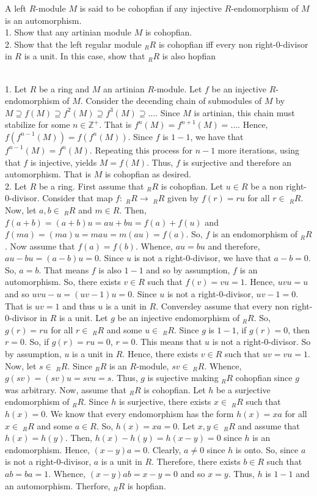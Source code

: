 A left $R$-module $M$ is said to be cohopfian if any injective $R$-endomorphism of $M$ is an
automorphism.\\
1. Show that any artinian module $M$ is cohopfian.\\
2. Show that the left regular module $_RR$ is cohopfian iff every non right-$0$-divisor in $R$ is a
unit. In this case, show that $_RR$ is also hopfian\\

\begin{solution}\renewcommand{\qedsymbol}{}\ \\
    1. Let $R$ be a ring and $M$ an artinian $R$-module. Let $f$ be an injective $R$-endomorphism of
    $M$. Consider the decending chain of submodules of $M$ by
    $M\supseteq f(M)\supseteq f^2(M)\supseteq f^3(M)\supseteq\ldots$. Since $M$ is artinian, this chain
    must stabilize for some $n\in\mathbb{Z}^+$. That is $f^n(M)=f^{n+1}(M)=\ldots$. Hence,
    $f(f^{n-1}(M))=f(f^n(M))$. Since $f$ is $1-1$, we have that $f^{n-1}(M)=f^n(M)$. Repeating this
    process for $n-1$ more iterations, using that $f$ is injective, yields $M=f(M)$. Thus, $f$ is
    surjective and therefore an automorphism. That is $M$ is cohopfian as desired.\\

    2. Let $R$ be a ring. First assume that $_RR$ is cohopfian. Let $u\in R$ be a non right-0-divisor.
    Consider that map $f:\;_RR\rightarrow\;_RR$ given by $f(r)=ru$ for all $r\in\;_RR$. Now, let
    $a,b\in\;_RR$ and $m\in R$. Then, $f(a+b)=(a+b)u=au+bu=f(a)+f(u)$ and $f(ma)=(ma)u=mau=m(au)=f(a)$.
    So, $f$ is an endomorphism of $_RR$. Now assume that $f(a)=f(b)$. Whence, $au=bu$ and therefore,
    $au-bu=(a-b)u=0$. Since $u$ is not a right-0-divisor, we have that $a-b=0$. So, $a=b$. That means
    $f$ is also $1-1$ and so by assumption, $f$ is an automorphism. So, there exists $v\in R$ such that
    $f(v)=vu=1$. Hence, $uvu=u$ and so $uvu-u=(uv-1)u=0$. Since $u$ is not a right-0-divisor, $uv-1=0$.
    That is $uv=1$ and thus $u$ is a unit in $R$. Conversley assume that every non right-0-divisor in
    $R$ is a unit. Let $g$ be an injective endomorphism of $_RR$. So, $g(r)=ru$ for all $r\in\;_RR$ and
    some $u\in\;_RR$. Since $g$ is $1-1$, if $g(r)=0$, then $r=0$. So, if $g(r)=ru=0$, $r=0$. This means
    that $u$ is not a right-0-divisor. So by assumption, $u$ is a unit in $R$. Hence, there exists
    $v\in R$ such that $uv=vu=1$. Now, let $s\in\;_RR$. Since $_RR$ is an $R$-module, $sv\in\;_RR$.
    Whence, $g(sv)=(sv)u=svu=s$. Thus, $g$ is sujective making $_RR$ cohopfian since $g$ was arbitrary.
    Now, assume that $_RR$ is cohopfian. Let $h$ be a surjective endomorphism of $_RR$. Since $h$ is
    surjective, there exists $x\in\;_RR$ such that $h(x)=0$. We know that every endomorphism has the
    form $h(x)=xa$ for all $x\in\;_RR$ and some $a\in R$. So, $h(x)=xa=0$. Let $x,y\in\;_RR$ and assume
    that $h(x)=h(y)$. Then, $h(x)-h(y)=h(x-y)=0$ since $h$ is an endomorphism. Hence, $(x-y)a=0$.
    Clearly, $a\neq0$ since $h$ is onto. So, since $a$ is not a right-0-divisor, $a$ is a unit in $R$.
    Therefore, there exists $b\in R$ such that $ab=ba=1$. Whence, $(x-y)ab=x-y=0$ and so $x=y$. Thus,
    $h$ is $1-1$ and an automorphism. Therfore, $_RR$ is hopfian.

\end{solution}